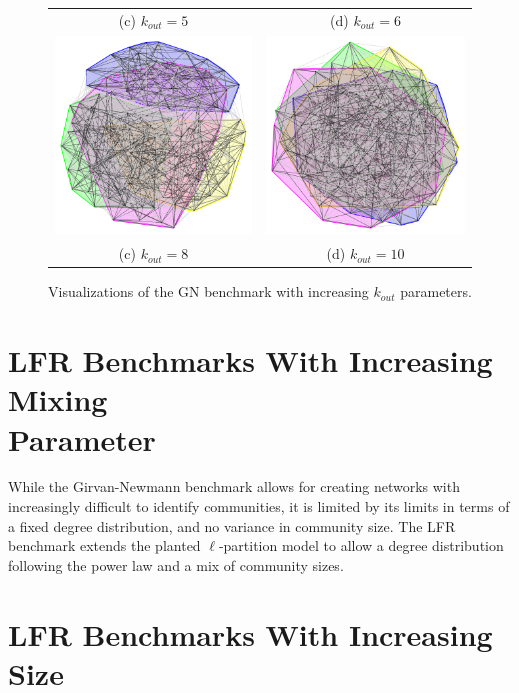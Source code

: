 \begin{figure}
\begin{tabular}{cc}
		(c) $k_{out}=5$ & (d) $k_{out}=6$ \\[6pt]
		\includegraphics[width=65mm]{images/girvan_kout_8_0.png} &   \includegraphics[width=65mm]{images/girvan_kout_10_0.png} \\
		(c) $k_{out}=8$ & (d) $k_{out}=10$ \\[6pt]
		
	\end{tabular}
	\caption{Visualizations of the GN benchmark with increasing $k_{out}$ parameters.}
\end{figure}



\section{LFR Benchmarks With Increasing Mixing \\ Parameter}
While the Girvan-Newmann benchmark allows for creating networks with increasingly difficult to identify communities, it is limited by its limits in terms of a fixed degree distribution, and no variance in community size. The LFR benchmark extends the planted $\ell$-partition model to allow a degree distribution following the power law and a mix of community sizes.










\section{LFR Benchmarks With Increasing Size}



